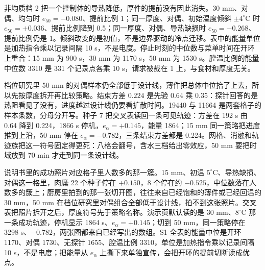 非均质档 2 把一个控制体的导热降低，厚件的提前没有因此消失。30 mm、对偶、均匀时 \(e_{50}=-0.080\)、提前比例 1；同一厚度、对偶、初始温度倾斜 \(\pm 4^\circ\mathrm{C}\) 时 \(e_{50}=+0.036\)、提前比例降到 0.5；同一厚度、对偶、导热缺损时 \(e_{50}=-0.268\)、提前比例仍是 1。倾斜改变的是初值，不是边界驱动的冷点迁移。表中的能量单位是加热指令乘以记录间隔 10 s，不是电度。停止时刻的中位数与菜单时间在开环上重合：15 mm 为 900 s，30 mm 为 1170 s，50 mm 为 1530 s。腔温比例的能量中位数 3310 是 331 个记录点各乘 10 s，请求被裁在 1 上，与食材和厚度无关。





档位研究里 50 mm 的对偶样本仍全部低于设计线，薄件把总体中位抬了上去，所以先按厚度拆开再比较策略。结束方差 \(0.224\) 是先验 0.64 乘 0.35：探针回答的是热阻看见了没有，进度越过设计线仍要看扩散时间。19440 与 11664 是两套格子的样本条数，分母分开写。种子 7 把交叉表读回一条可见轨迹：方差在 192 s 由 0.64 降到 0.224，1866 s 停机，\(e_{\alpha}=+0.145\)，能量 1864；15 mm 同一策略把进度推到上沿，50 mm 停在 \(e_{\alpha}=-0.782\)，三条结束方差都是 0.224。网格、消融和轨迹族把这一符号固定得更死：八格会翻号，含水三档给出零效应，50 mm 要把时域放到 70 min 才走到同一条设计线。

说明书里的成功照片对应格子里人数多的那一簇。15 mm、初温 \(5^\circ\mathrm{C}\)、导热缺损、对偶这一格里，肉糜 22 个种子停在 \(+0.150\)，8 个停在约 \(-0.525\)，中位数落在人数多的簇上；厨房里拍到的那一张切开图，往往来自已经饱和的薄件或已经回温的 30 mm，50 mm 在档位研究里对偶组合全部低于设计线，拍不到这张照片。交叉表把照片拆开之后，厚度符号先于策略名称。演示页默认读的是 30 mm、\(8^\circ\mathrm{C}\) 那一条成功轨迹，停机显示 1864 s、\(e_{\alpha}=+0.145\)；切到 50 mm，同一策略停在 3298 s、\(-0.782\)，两张图都来自已经写出的数组。S1 全表的能量中位是开环 1170、对偶 1730、无探针 1655、腔温比例 3310，单位是加热指令乘以记录间隔 10 s，不是电度；把能量从 \(e_{\alpha}\) 上撕下来单独宣传，会把开环的提前切断读成优点。

\FloatBarrier
